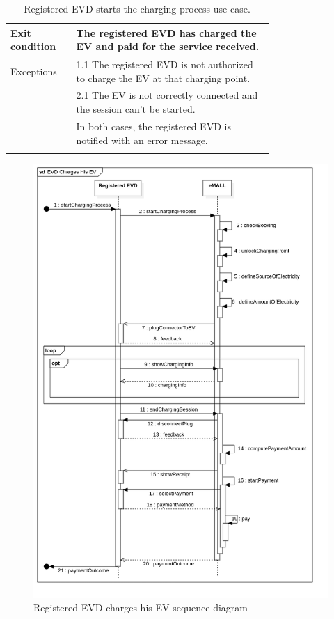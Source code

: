 \begin{center}
\begin{longtable}{lp{0.75\linewidth}}
        Exit condition   & The registered EVD has charged the EV and paid for the service received.                                                    \\
        \hline
        Exceptions       & 1.1 The registered EVD is not authorized to charge the EV at that charging point.                                           \\
        & 2.1 The EV is not correctly connected and the session can't be started.                                                     \\
        & In both cases, the registered EVD is notified with an error message.                                                        \\
        \hline
        \caption{Registered EVD starts the charging process use case.}
        \label{tab: EVD_charges_EV_use_case}
    \end{longtable}
    \begin{figure} [H]
        \begin{center}
            \includegraphics[width=0.9\linewidth]{Images/SequenceDiagrams/evd_charges_his_ev}
            \caption{Registered EVD charges his EV sequence diagram}
            \label{fig:evd_starts_charging_seq_diag}
        \end{center}
    \end{figure}
\end{center}

